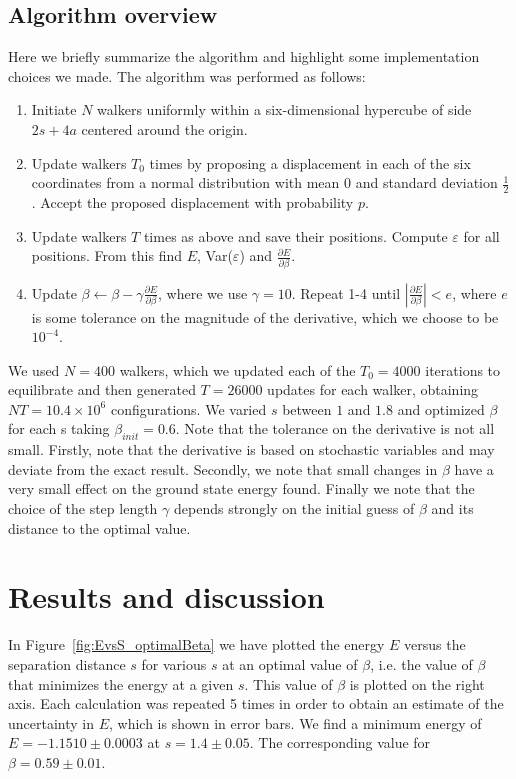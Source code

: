\documentclass[twoside]{article}
\begin{document}
\subsection{Algorithm overview}\label{sec:algorithm}
Here we briefly summarize the algorithm and highlight some implementation choices we made. The algorithm was performed as follows:

\begin{enumerate}
	\item Initiate $N$ walkers uniformly within a six-dimensional hypercube of side $2s + 4a$ centered around the origin.
	\item Update walkers $T_0$ times by proposing a displacement in each of the six coordinates from a normal distribution with mean $0$ and standard deviation $\frac{1}{2}$. Accept the proposed displacement with probability $p$.
	\item Update walkers $T$ times as above and save their positions. Compute $\varepsilon$ for all positions. From this find $E$, Var($\varepsilon$) and $\frac{\partial E}{\partial \beta}$.
	\item Update $\beta \leftarrow \beta - \gamma \frac{\partial E}{\partial \beta}$, where we use $\gamma = 10$. Repeat 1-4 until $|\frac{\partial E}{\partial \beta}| < e$, where $e$ is some tolerance on the magnitude of the derivative, which we choose to be $10^{-4}$.
\end{enumerate}
We used $N = 400$ walkers, which we updated each of the $T_0 = 4000$ iterations to equilibrate and then generated $T = 26000$ updates for each walker, obtaining $NT = 10.4 \times 10^6$ configurations. We varied $s$ between $1$ and $1.8$ and optimized $\beta$ for each s taking $\beta_{init} = 0.6$.
Note that the tolerance on the derivative is not all small. Firstly, note that the derivative is based on stochastic variables and may deviate from the exact result. Secondly, we note that small changes in $\beta$ have a very small effect on the ground state energy found. Finally we note that the choice of the step length $\gamma$ depends strongly on the initial guess of $\beta$ and its distance to the optimal value. 



\section{Results and discussion}\label{ch_results}
In Figure~\ref{fig:EvsS_optimalBeta} we have plotted the energy $E$ versus the separation distance $s$ for various $s$ at an optimal value of $\beta$, i.e. the value of $\beta$ that minimizes the energy at a given $s$. This value of $\beta$ is plotted on the right axis. Each calculation was repeated 5 times in order to obtain an estimate of the uncertainty in $E$, which is shown in error bars. We find a minimum energy of $E = -1.1510 \pm 0.0003$ at $s = 1.4 \pm 0.05$. The corresponding value for $\beta = 0.59 \pm 0.01$. 
\end{document}
